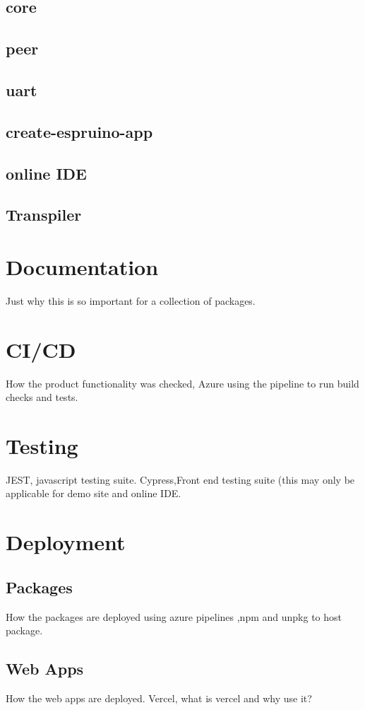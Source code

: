 \documentclass{l4proj}
\begin{document}
\subsection{core}
\subsection{peer}
\subsection{uart}
\subsection{create-espruino-app}
\subsection{online IDE}
\subsection{Transpiler}

\section{Documentation}
\text Just why this is so important for a collection of packages.
\section{CI/CD}
\text How the product functionality was checked, Azure using the pipeline to run build checks and tests.

\section{Testing}
\text JEST, javascript testing suite. Cypress,Front end testing suite (this may only be applicable for demo site and online IDE.


\section{Deployment}
\subsection{Packages}
\text How the packages are deployed using azure pipelines ,npm and unpkg to host package.
\subsection{Web Apps}
\text How the web apps are deployed. Vercel, what is vercel and why use it?
\end{document}
